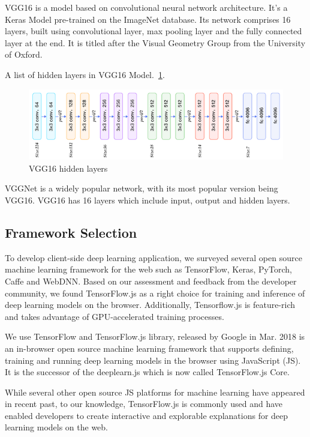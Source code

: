 

VGG16 is a model based on convolutional neural network architecture. It's a Keras Model pre-trained on the ImageNet database. Its network comprises 16 layers, built using convolutional layer, max pooling layer and the fully connected layer at the end.  It is titled after the Visual Geometry Group from the University of Oxford. 

A list of hidden layers in VGG16 Model.~\ref{fig:CNN-1}.
\begin{figure}[htbp]
\centering
\includegraphics[width=1\textwidth]{images/vgg-hidden-layers.png}
\caption{VGG16 hidden layers}
\label{fig:CNN-1}
\end{figure}

VGGNet is a widely popular network, with its most popular version being VGG16. VGG16 has 16 layers which include input, output and hidden layers.
    
\subsection{Framework Selection}

To develop client-side deep learning application, we surveyed several open source machine learning framework for the web such as TensorFlow, Keras, PyTorch, Caffe and WebDNN. Based on our assessment and feedback from the developer community, we found TensorFlow.js as a right choice for training and inference of deep learning models on the browser. Additionally, Tensorflow.js is feature-rich and takes advantage of GPU-accelerated training processes. 

We use TensorFlow and TensorFlow.js library, released by Google in Mar. 2018 is an in-browser open source machine learning framework that supports defining, training and running deep learning models in the browser using JavaScript (JS). It is the successor of the deeplearn.js which is now called TensorFlow.js Core. 

While several other open source JS platforms for machine learning have appeared in recent past, to our knowledge, TensorFlow.js is commonly used and have enabled developers to create interactive and explorable explanations for deep learning models on the web.

